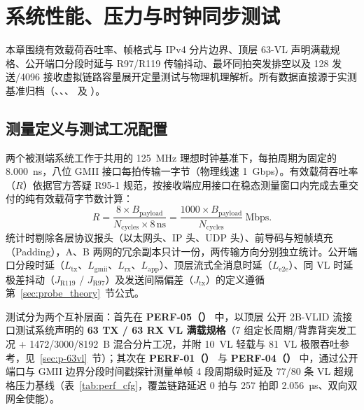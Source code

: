 \chapter{系统性能、压力与时钟同步测试}\label{ch:perf}

本章围绕有效载荷吞吐率、帧格式与 IPv4 分片边界、顶层  63-VL 声明满载规格、公开端口分段时延与 R97/R119 传输抖动、最坏同拍突发排空以及 128 发送/4096 接收虚拟链路容量展开定量测试与物理机理解析。所有数据直接源于实测基准归档（、、、 及 ）。

\section{测量定义与测试工况配置}\label{sec:p-def}

两个被测端系统工作于共用的 125~MHz 理想时钟基准下，每拍周期为固定的 8.000~ns，八位 GMII 接口每拍传输一字节（物理线速 1~Gbps）。有效载荷吞吐率（$R$）依据官方答疑 R95-1 规范，按接收端应用接口在稳态测量窗口内完成去重交付的纯有效载荷字节数计算：
\begin{equation}
  R = \frac{8 \times B_\text{payload}}{N_\text{cycles} \times 8\,\text{ns}} = \frac{1000 \times B_\text{payload}}{N_\text{cycles}}\ \text{Mbps}.
\end{equation}
统计时剔除各层协议报头（以太网头、IP 头、UDP 头）、前导码与短帧填充（Padding），A、B 两网的冗余副本只计一份，两传输方向分别独立统计。公开端口分段时延（$L_\text{tx}$、$L_\text{gmii}$、$L_\text{rx}$、$L_\text{app}$）、顶层流式全消息时延（$L_\text{e2e}$）、同 VL 时延极差抖动（$J_\text{R119}$ / $J_\text{R97}$）及发送间隔偏差（$J_\text{tx}$）的定义遵循第~\ref{sec:probe_theory}~节公式。

测试分为两个互补层面：首先在 \textbf{PERF-05（）} 中，以顶层  公开 2B-VLID 流接口测试系统声明的 \textbf{63 TX / 63 RX VL 满载规格}（7 组定长周期/背靠背突发工况 + 1472/3000/8192~B 混合分片工况，并附 10~VL 轻载与 81~VL 极限吞吐参考，见~\ref{sec:p-63vl}~节）；其次在 \textbf{PERF-01（）} 与 \textbf{PERF-04（）} 中，通过公开端口与 GMII 边界分段时间戳探针测量单帧 4 段周期级时延及 77/80 条 VL 超规格压力基线（表~\ref{tab:perf_cfg}，覆盖链路延迟 0 拍与 257 拍即 2.056~µs、双向双网全使能）。

\begingroup

